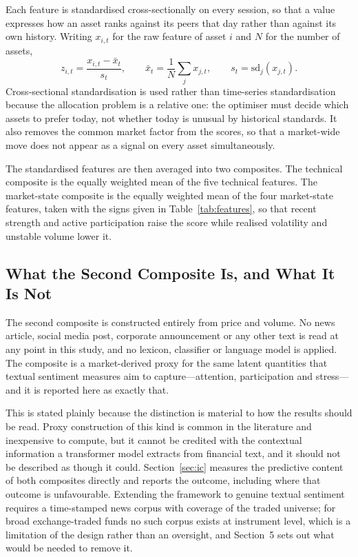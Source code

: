 Each feature is standardised cross-sectionally on every session, so that a value
expresses how an asset ranks against its peers that day rather than against its own
history. Writing $x_{i,t}$ for the raw feature of asset $i$ and $N$ for the number of
assets,
\begin{equation}
z_{i,t} = \frac{x_{i,t} - \bar{x}_t}{s_t}, \qquad
\bar{x}_t = \frac{1}{N}\sum_{j} x_{j,t}, \qquad
s_t = \mathrm{sd}_j(x_{j,t}).
\end{equation}
Cross-sectional standardisation is used rather than time-series standardisation because
the allocation problem is a relative one: the optimiser must decide which assets to
prefer today, not whether today is unusual by historical standards. It also removes the
common market factor from the scores, so that a market-wide move does not appear as a
signal on every asset simultaneously.

The standardised features are then averaged into two composites. The technical
composite is the equally weighted mean of the five technical features. The market-state
composite is the equally weighted mean of the four market-state features, taken with
the signs given in Table~\ref{tab:features}, so that recent strength and active participation raise the
score while realised volatility and unstable volume lower it.

\subsection{What the Second Composite Is, and What It Is Not}
\label{sec:notsentiment}

The second composite is constructed entirely from price and volume. No news article,
social media post, corporate announcement or any other text is read at any point in
this study, and no lexicon, classifier or language model is applied. The composite is a
market-derived proxy for the same latent quantities that textual sentiment measures aim
to capture---attention, participation and stress---and it is reported here as exactly
that.

This is stated plainly because the distinction is material to how the results should be
read. Proxy construction of this kind is common in the literature and inexpensive to
compute, but it cannot be credited with the contextual information a transformer model
extracts from financial text, and it should not be described as though it could.
Section~\ref{sec:ic} measures the predictive content of both composites directly and
reports the outcome, including where that outcome is unfavourable. Extending the
framework to genuine textual sentiment requires a time-stamped news corpus with
coverage of the traded universe; for broad exchange-traded funds no such corpus exists
at instrument level, which is a limitation of the design rather than an oversight, and
Section~5 sets out what would be needed to remove it.

